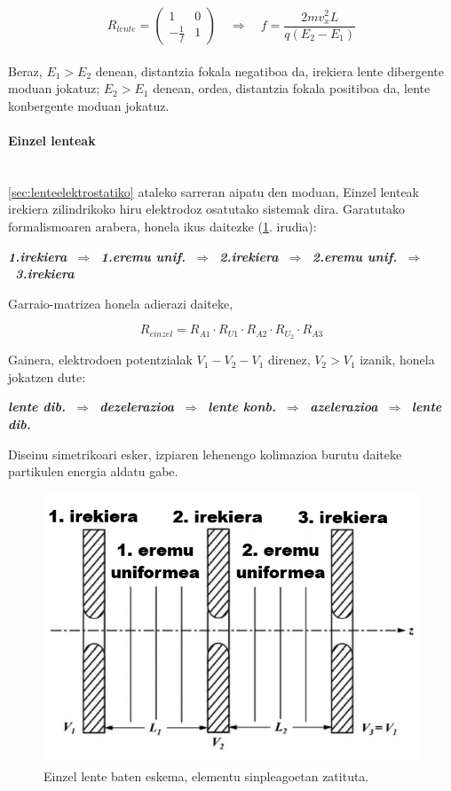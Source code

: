 \documentclass[12pt]{article}
\numberwithin{figure}{section}
\numberwithin{equation}{section}
\begin{document}
\begin{equation}
    R_{lente}=\begin{pmatrix}
        1 & 0\\
        -\frac{1}{f} & 1
    \end{pmatrix} \quad \Longrightarrow \quad f=\frac{2mv_x^2L}{q(E_2-E_1)}
\end{equation}\\

Beraz, $E_1>E_2$ denean, distantzia fokala negatiboa da, irekiera lente dibergente moduan jokatuz; $E_2>E_1$ denean, ordea, distantzia fokala positiboa da, lente konbergente moduan jokatuz.
\paragraph{Einzel lenteak}\leavevmode\\

\ref{sec:lenteelektrostatiko} ataleko sarreran aipatu den moduan, Einzel lenteak irekiera zilindrikoko hiru elektrodoz osatutako sistemak dira. Garatutako formalismoaren arabera, honela ikus daitezke (\ref{fig:einzeleskema}. irudia):

\begin{center}
    \textbf{\textit{1.irekiera~$\Rightarrow$~1.eremu unif.~$\Rightarrow$~2.irekiera~$\Rightarrow$~2.eremu unif.~$\Rightarrow$~3.irekiera}}
\end{center}

Garraio-matrizea honela adierazi daiteke,

\begin{equation}
\boxed{
    R_{einzel}=R_{A1}\cdot R_{U1}\cdot R_{A2}\cdot R_{U_2} \cdot{R_{A3}}
}
\end{equation}

Gainera, elektrodoen potentzialak $V_1-V_2-V_1$ direnez, $V_2>V_1$ izanik, honela jokatzen dute:

\begin{center}
    \textbf{\textit{lente dib.~$\Rightarrow$~dezelerazioa~$\Rightarrow$~lente konb.~$\Rightarrow$~azelerazioa~$\Rightarrow$~lente dib.}}
\end{center}

Diseinu simetrikoari esker, izpiaren lehenengo kolimazioa burutu daiteke partikulen energia aldatu gabe.

\begin{figure}[h]
    \centering
    \includegraphics[width=0.6\linewidth]{2 - Oinarri teorikoa/einzel_lens_scheme.png}
    \caption{Einzel lente baten eskema, elementu sinpleagoetan zatituta.}
    \label{fig:einzeleskema}
\end{figure}
\end{document}
